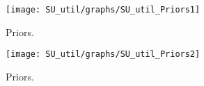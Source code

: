  
\begin{figure}[H]
\centering
\texttt{[image: SU\_util/graphs/SU\_util\_Priors1]}
\caption{Priors.}\label{Fig:Priors:1}
\end{figure}
\begin{figure}[H]
\centering
\texttt{[image: SU\_util/graphs/SU\_util\_Priors2]}
\caption{Priors.}\label{Fig:Priors:2}
\end{figure}
 
